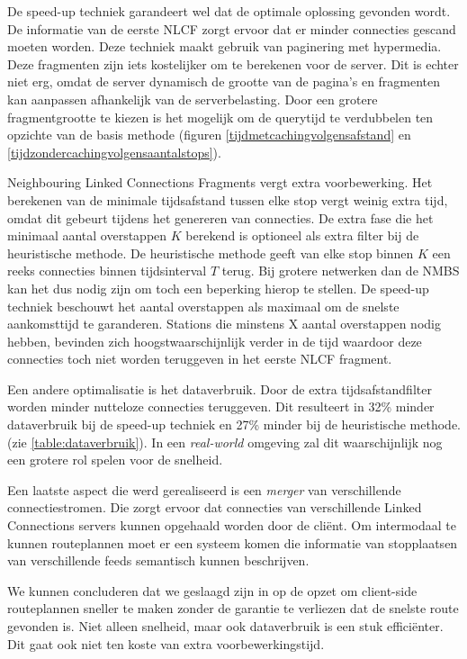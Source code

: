 De speed-up techniek garandeert wel dat de optimale oplossing gevonden wordt. De informatie van de eerste NLCF zorgt ervoor dat er minder connecties gescand moeten worden. Deze techniek maakt gebruik van paginering met hypermedia. Deze fragmenten zijn iets kostelijker om te berekenen voor de server. Dit is echter niet erg, omdat de server dynamisch de grootte van de pagina's en fragmenten kan aanpassen afhankelijk van de serverbelasting. Door een grotere fragmentgrootte te kiezen is het mogelijk om de querytijd te verdubbelen ten opzichte van de basis methode (figuren \ref{tijdmetcachingvolgensafstand} en \ref{tijdzondercachingvolgensaantalstops}).

Neighbouring Linked Connections Fragments vergt extra voorbewerking. Het berekenen van de minimale tijdsafstand tussen elke stop vergt weinig extra tijd, omdat dit gebeurt tijdens het genereren van connecties. De extra fase die het minimaal aantal overstappen $K$ berekend is optioneel als extra filter bij de heuristische methode. De heuristische methode geeft van elke stop binnen $K$ een reeks connecties binnen tijdsinterval $T$ terug. Bij grotere netwerken dan de NMBS kan het dus nodig zijn om toch een beperking hierop te stellen. De speed-up techniek beschouwt het aantal overstappen als maximaal om de snelste aankomsttijd te garanderen. Stations die minstens X aantal overstappen nodig hebben, bevinden zich hoogstwaarschijnlijk verder in de tijd waardoor deze connecties toch niet worden teruggeven in het eerste NLCF fragment.

Een andere optimalisatie is het dataverbruik. Door de extra tijdsafstandfilter worden minder nutteloze connecties teruggeven. Dit resulteert in 32\% minder dataverbruik bij de speed-up techniek en 27\% minder bij de heuristische methode. (zie \ref{table:dataverbruik}). In een \textit{real-world} omgeving zal dit waarschijnlijk nog een grotere rol spelen voor de snelheid.

Een laatste aspect die werd gerealiseerd is een \textit{merger} van verschillende connectiestromen. Die zorgt ervoor dat connecties van verschillende Linked Connections servers kunnen opgehaald worden door de cli\"ent. Om intermodaal te kunnen routeplannen moet er een systeem komen die informatie van  stopplaatsen van verschillende feeds semantisch kunnen beschrijven.

We kunnen concluderen dat we geslaagd zijn in op de opzet om client-side routeplannen sneller te maken zonder de garantie te verliezen dat de snelste route gevonden is. Niet alleen snelheid, maar ook dataverbruik is een stuk effici\"enter. Dit gaat ook niet ten koste van extra voorbewerkingstijd.

